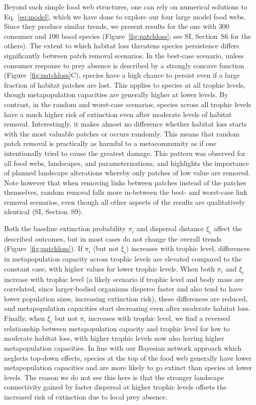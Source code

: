 \documentclass[11pt]{article}
\newcommand{\SI}{SI}
\begin{document}
Beyond such simple food web structures, one can rely on numerical solutions to Eq.~\ref{eq:model}, which we have done to explore our four large model food webs. Since they produce similar trends, we present results for the one with $300$ consumer and $100$ basal species (Figure~\ref{fig:patchloss}; see \SI, Section~S6 for the others). The extent to which habitat loss threatens species persistence differs significantly between patch removal scenarios. In the best-case scenario, unless consumer response to prey absence is described by a strongly concave function (Figure~\ref{fig:patchloss}C), species have a high chance to persist even if a large fraction of habitat patches are lost. This applies to species at all trophic levels, though metapopulation capacities are generally higher at lower levels. By contrast, in the random and worst-case scenarios, species across all trophic levels have a much higher risk of extinction even after moderate levels of habitat removal. Interestingly, it makes almost no difference whether habitat loss starts with the most valuable patches or occurs randomly. This means that random patch removal is practically as harmful to a metacommunity as if one intentionally tried to cause the greatest damage. This pattern was observed for all food webs, landscapes, and parameterizations, and highlights the importance of planned landscape alterations whereby only patches of low value are removed. Note however that when removing links between patches instead of the patches themselves, random removal falls more in-between the best- and worst-case link removal scenarios, even though all other aspects of the results are qualitatively identical (\SI, Section~S9).

Both the baseline extinction probability $\pi_i$ and dispersal distance $\xi_i$ affect the described outcomes, but in most cases do not change the overall trends (Figure~\ref{fig:patchloss}). If $\pi_i$ (but not $\xi_i$) increases with trophic level, differences in metapopulation capacity across trophic levels are elevated compared to the constant case, with higher values for lower trophic levels. When both $\pi_i$ and $\xi_i$ increase with trophic level (a likely scenario if trophic level and body mass are correlated, since larger-bodied organisms disperse faster and also tend to have lower population sizes, increasing extinction risk), these differences are reduced, and metapopulation capacities start decreasing even after moderate habitat loss. Finally, when $\xi_i$ but not $\pi_i$ increases with trophic level, we find a reversed relationship between metapopulation capacity and trophic level for low to moderate habitat loss, with higher trophic levels now also having higher metapopulation capacities. In line with our Bayesian network approach which neglects top-down effects, species at the top of the food web generally have lower metapopulation capacities and are more likely to go extinct than species at lower levels. The reason we do not see this here is that the stronger landscape connectivity gained by faster dispersal at higher trophic levels offsets the increased risk of extinction due to local prey absence.
\end{document}
